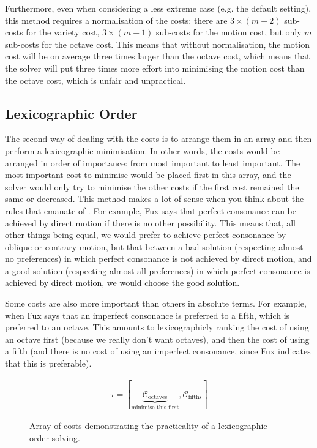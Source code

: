 Furthermore, even when considering a less extreme case (e.g. the default setting), this method requires a normalisation of the costs: there are $3\times (m-2)$ sub-costs for the variety cost, $3\times (m-1)$ sub-costs for the motion cost, but only $m$ sub-costs for the octave cost. This means that without normalisation, the motion cost will be on average three times larger than the octave cost, which means that the solver will put three times more effort into minimising the motion cost than the octave cost, which is unfair and unpractical.


\subsection{Lexicographic Order}\label{section:lexicographic-order}
The second way of dealing with the costs is to arrange them in an array and then perform a lexicographic minimisation. In other words, the costs would be arranged in order of importance: from most important to least important. The most important cost to minimise would be placed first in this array, and the solver would only try to minimise the other costs if the first cost remained the same or decreased. This method makes a lot of sense when you think about the rules that emanate of \gap. For example, Fux says that perfect consonance can be achieved by direct motion if there is no other possibility. This means that, all other things being equal, we would prefer to achieve perfect consonance by oblique or contrary motion, but that between a bad solution (respecting almost no preferences) in which perfect consonance is not achieved by direct motion, and a good solution (respecting almost all preferences) in which perfect consonance is achieved by direct motion, we would choose the good solution. 

Some costs are also more important than others in absolute terms. For example, when Fux says that an imperfect consonance is preferred to a fifth, which is preferred to an octave. This amounts to lexicographicly ranking the cost of using an octave first (because we really don't want octaves), and then the cost of using a fifth (and there is no cost of using an imperfect consonance, since Fux indicates that this is preferable).
\begin{figure}[h]
    \begin{equation}
        \begin{aligned}
            \tau = [\underset{\text{minimise this first}}{\underbrace{\mathcal{C}_\text{octaves}}}, \mathcal{C}_\text{fifths}]
        \end{aligned}
    \end{equation}
    \caption{Array of costs demonstrating the practicality of a lexicographic order solving.}
\end{figure}

